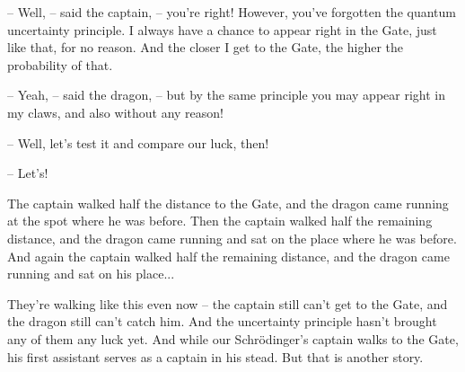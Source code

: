 \documentclass[ebook,oneside,final,openright]{memoir}
\begin{document}
– Well, – said the captain, – you’re right! However, you’ve forgotten the quantum uncertainty principle. I always have a chance to appear right in the Gate, just like that, for no reason. And the closer I get to the Gate, the higher the probability of that.\par
– Yeah, – said the dragon, – but by the same principle you may appear right in my claws, and also without any reason!\par
– Well, let’s test it and compare our luck, then!\par
– Let’s!\par
\par
The captain walked half the distance to the Gate, and the dragon came running at the spot where he was before. Then the captain walked half the remaining distance, and the dragon came running and sat on the place where he was before. And again the captain walked half the remaining distance, and the dragon came running and sat on his place...\par
\par
They’re walking like this even now – the captain still can’t get to the Gate, and the dragon still can’t catch him. And the uncertainty principle hasn’t brought any of them any luck yet. And while our Schrödinger’s captain walks to the Gate, his first assistant serves as a captain in his stead. But that is another story.
\end{document}
